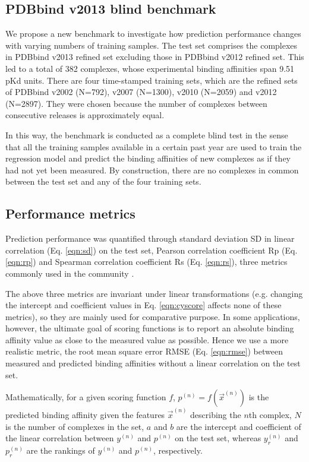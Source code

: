 \documentclass[journal=jacsat,manuscript=article]{achemso}
\begin{document}
\subsection{PDBbind v2013 blind benchmark}

We propose a new benchmark to investigate how prediction performance changes with varying numbers of training samples. The test set comprises the complexes in PDBbind v2013 refined set excluding those in PDBbind v2012 refined set. This led to a total of 382 complexes, whose experimental binding affinities span 9.51 pKd units. There are four time-stamped training sets, which are the refined sets of PDBbind v2002 (N=792), v2007 (N=1300), v2010 (N=2059) and v2012 (N=2897). They were chosen because the number of complexes between consecutive releases is approximately equal.

In this way, the benchmark is conducted as a complete blind test in the sense that all the training samples available in a certain past year are used to train the regression model and predict the binding affinities of new complexes as if they had not yet been measured. By construction, there are no complexes in common between the test set and any of the four training sets.

\subsection{Performance metrics}

Prediction performance was quantified through standard deviation SD in linear correlation (Eq. \ref{eqn:sd}) on the test set, Pearson correlation coefficient Rp (Eq. \ref{eqn:rp}) and Spearman correlation coefficient Rs (Eq. \ref{eqn:rs}), three metrics commonly used in the community \cite{1313}.

The above three metrics are invariant under linear transformations (e.g. changing the intercept and coefficient values in Eq. \ref{eqn:cyscore} affects none of these metrics), so they are mainly used for comparative purpose. In some applications, however, the ultimate goal of scoring functions is to report an absolute binding affinity value as close to the measured value as possible. Hence we use a more realistic metric, the root mean square error RMSE (Eq. \ref{eqn:rmse}) between measured and predicted binding affinities without a linear correlation on the test set.

Mathematically, for a given scoring function $f$, $p^{(n)}=f(\overrightarrow{x}^{(n)})$ is the predicted binding affinity given the features $\overrightarrow{x}^{(n)}$ describing the $n$th complex, $N$ is the number of complexes in the set, $a$ and $b$ are the intercept and coefficient of the linear correlation between $y^{(n)}$ and $p^{(n)}$ on the test set, whereas $y_r^{(n)}$ and $p_r^{(n)}$ are the rankings of $y^{(n)}$ and $p^{(n)}$, respectively. 
\end{document}
